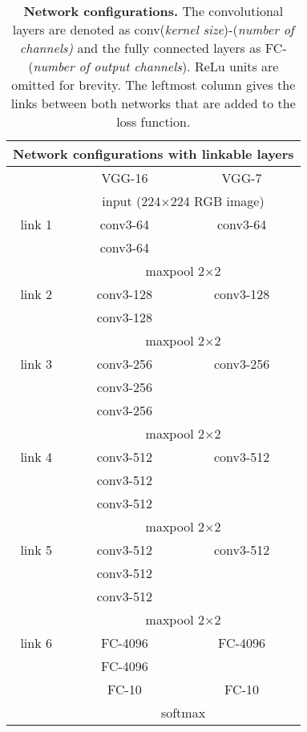 \documentclass[10pt,twocolumn,letterpaper]{article}
\begin{document}
\begin{table}
	\begin{center}
	\begin{tabular}{|c|c|c|}
		\hline
		\multicolumn{3}{|c|}{Network configurations with linkable layers} 	\\ \hline
				&	VGG-16		&	VGG-7									\\ \hline
		\hline
				& \multicolumn{2}{c|}{input (224$\times$224 RGB image)} 	\\ \hline
		link 1	&	conv3-64	&	conv3-64								\\ 
				& 	conv3-64	&											\\ \hline
		
				& \multicolumn{2}{c|}{maxpool 2$\times$2} 					\\ \hline
		link 2	&	conv3-128	&	conv3-128								\\ 
				& 	conv3-128	&											\\ \hline
			
				& \multicolumn{2}{c|}{maxpool 2$\times$2} 					\\ \hline
		link 3	&	conv3-256	&	conv3-256								\\ 
				& 	conv3-256	&											\\ 
				& 	conv3-256	&											\\ \hline
				& \multicolumn{2}{c|}{maxpool 2$\times$2} 					\\ \hline
		link 4	&	conv3-512	&	conv3-512								\\ 
				& 	conv3-512	&											\\ 
				& 	conv3-512	&											\\ \hline
				& \multicolumn{2}{c|}{maxpool 2$\times$2} 					\\ \hline
		link 5	&	conv3-512	&	conv3-512								\\ 
				& 	conv3-512	&											\\ 
				& 	conv3-512	&											\\ \hline
				& \multicolumn{2}{c|}{maxpool 2$\times$2} 					\\ \hline
		link 6	&	FC-4096		&	FC-4096									\\ 
				& 	FC-4096		&											\\ 
				& 	FC-10		&	FC-10									\\ \hline
				& \multicolumn{2}{c|}{softmax} 								\\ \hline
			
	\end{tabular}
	\end{center}
	\label{tab:network_architectures}
	\caption{\textbf{Network configurations.} The convolutional layers are denoted as conv(\textit{kernel size})-(\textit{number of channels)} and the fully 		connected layers as FC-(\textit{number of output channels}). ReLu units are omitted for brevity. The leftmost column gives the links between both networks that are added to the loss function.}
\end{table}
\end{document}
